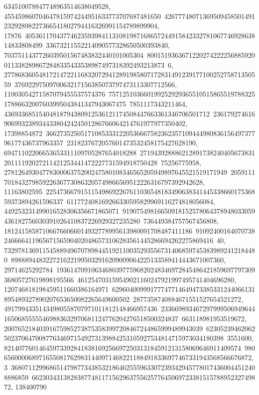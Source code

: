 {{{634510078847748963514638049528, 455459860704647815974244951633773707687481650\
4267774807136950945850149123292898227366541802794416326991154789899904, 17876\
40536117043774623593984113108198716865724491584233278106774692863814833808499\
33673211552214090577328650500393840, 7037511437726039501567483832440101005304\
80015193636712202742222568859200113382898672848335433538987497318392493213873\
6, 27786836054817214722116832072941289198580717283149123917710025275871350559\
3769229750970063217156385073797473113307712566, 11003054271587079455537574376\
75712510366019925292936551051586551978832517886632007603995043841347943067475\
7851117343211464, 43693368515404818794380912536121174508447663361346706501712\
2361792746169069932389344338042424501286766064214761977977350402, 17398854872\
36627352505171085333122053666758236235710944498083615649737796177436737963357\
2318237672057601473532458175427628190, 69471102206653653311109705287654018288\
27194392888621289173824040567383120111192027211421253441472227731594918750428\
75256775958, 2781264930477830006375200247580108346565205949897645521519171949\
2059111701843279859226367730863205749866569512226316797392942628, 11163802595\
22547366791511549869226761103654818349063834144533866017536859373894261596337\
611772408169266330595829969116274818056084, 449253231499016528306356671865071\
91907549816650918152578064378948033059436182756030391026410837226929327235280\
736449384757567456808, 181241585871066766066014932778995613980091708487411186\
91092400164070738246666411965671565904020486573106283561445286694262275869416\
40, 7329781369115458894967078984451921100352935567314068597453839892412184480\
8988894483227216221995032916209009064225133589414443671007360, 29714625292784\
19361470910634680397759682024834697284548642185969779730936805727619898195566\
461254703159549021160247921997495741404696280, 120746818198459511660386164971\
62960400999177747714649473385331244066131895489327890207653650082265649600502\
2877358740884671551527654521272, 49179943351434980558707971011812148466957436\
23366989346729799950694964416506855555469883632970681124776204276518500324837\
663118981953519672, 200765218403916759852738753583997208467244865999489943039\
62305239462062502370647008776346971549273139884253105927534814715973034180398\
3551600, 82140776014645973392841838169256697250313184591213158069646911409574\
98065600006897165508176298314409714682211884918336977467331943568566676872, 3\
36807112996865147987734385321864625559633072393429457780174360044512408886859\
662303431382838774811715629637556257764506972338151578895232749872, 138400790\
}}}
